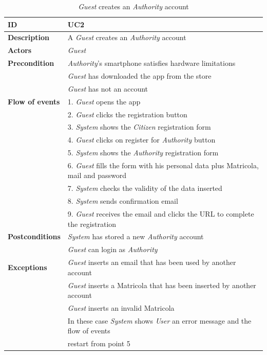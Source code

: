 \documentclass{article}
\begin{document}
\clearpage
\begin{table}
    \begin{center}
    \centering
\begin{tabular}{ | l | l |}
\hline
\textbf{ID} & UC2 \\
\hline
\textbf{Description} & A \textit{Guest} creates an \textit{Authority} account \\
\hline
\textbf{Actors} & \textit{Guest} \\
\hline
\textbf{Precondition} & \textit{Authority}'s smartphone satisfies hardware limitations \\
             & \textit{Guest} has downloaded the app from the store \\
             & \textit{Guest} has not an account\\ 
\hline
\textbf{Flow of events} & 1. \textit{Guest} opens the app \\
                        & 2. \textit{Guest} clicks the registration button \\
                        & 3. \textit{System} shows the \textit{Citizen} registration form \\
                        & 4. \textit{Guest} clicks on register for \textit{Authority} button \\
                        & 5. \textit{System} shows the \textit{Authority} registration form \\
                        & 6. \textit{Guest} fills the form with his personal data plus Matricola, mail and password \\
                        & 7. \textit{System} checks the validity of the data inserted \\
                        & 8. \textit{System} sends confirmation email \\
                        & 9. \textit{Guest} receives the email and clicks the URL to complete the registration \\  
\hline
\textbf{Postconditions} & \textit{System} has stored a new \textit{Authority} account  \\
                        & \textit{Guest} can login as \textit{Authority} \\
\hline
\textbf{Exceptions} & \textit{Guest} inserts an email that has been used by another account \\
                    & \textit{Guest} inserts a Matricola that has been inserted by another account \\
                    & \textit{Guest} inserts an invalid Matricola \\
                    & In these case \textit{System} shows \textit{User} an error message and the flow of events  \\
                    & restart from point 5 \\  
\hline
\end{tabular}
\caption{\textit{Guest} creates an \textit{Authority} account}
\end{center}
\end{table}
\end{document}
